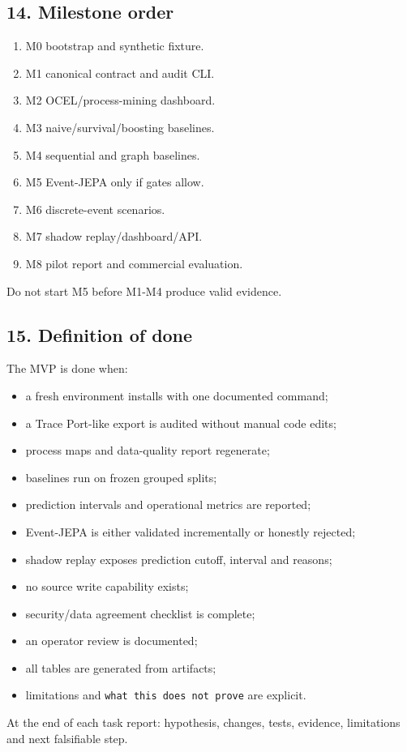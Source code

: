 \documentclass[
  spanish,
  10pt,
  a4paper,
]{article}
\providecommand{\tightlist}{%
  \setlength{\itemsep}{0pt}\setlength{\parskip}{0pt}}
\begin{document}
\subsection{14. Milestone order}\label{14-milestone-order}

\begin{enumerate}
\def\labelenumi{\arabic{enumi}.}
\tightlist
\item
  M0 bootstrap and synthetic fixture.
\item
  M1 canonical contract and audit CLI.
\item
  M2 OCEL/process-mining dashboard.
\item
  M3 naive/survival/boosting baselines.
\item
  M4 sequential and graph baselines.
\item
  M5 Event-JEPA only if gates allow.
\item
  M6 discrete-event scenarios.
\item
  M7 shadow replay/dashboard/API.
\item
  M8 pilot report and commercial evaluation.
\end{enumerate}

Do not start M5 before M1-M4 produce valid evidence.

\subsection{15. Definition of done}\label{15-definition-of-done}

The MVP is done when:

\begin{itemize}
\tightlist
\item
  a fresh environment installs with one documented command;
\item
  a Trace Port-like export is audited without manual code edits;
\item
  process maps and data-quality report regenerate;
\item
  baselines run on frozen grouped splits;
\item
  prediction intervals and operational metrics are reported;
\item
  Event-JEPA is either validated incrementally or honestly rejected;
\item
  shadow replay exposes prediction cutoff, interval and reasons;
\item
  no source write capability exists;
\item
  security/data agreement checklist is complete;
\item
  an operator review is documented;
\item
  all tables are generated from artifacts;
\item
  limitations and \texttt{what\ this\ does\ not\ prove} are explicit.
\end{itemize}

At the end of each task report: hypothesis, changes, tests, evidence,
limitations and next falsifiable step.
\end{document}
